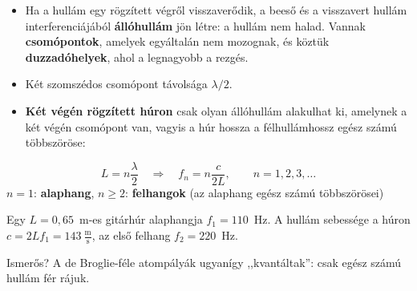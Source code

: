 \documentclass[12pt]{article}
\newcommand{\dia}[1]{\newpage{\Large\bfseries #1}\par\vspace{2pt}{\color{blue!50!black}\hrule height 1pt}\vspace{8pt}}
\begin{document}
\dia{12. Állóhullám}

\begin{minipage}[t]{0.52\linewidth}\vspace{0pt}
\begin{itemize}
  \item Ha a hullám egy rögzített végről visszaverődik, a beeső és a visszavert hullám
    interferenciájából \textbf{állóhullám} jön létre: a hullám nem halad. Vannak
    \textbf{csomópontok}, amelyek egyáltalán nem mozognak, és köztük
    \textbf{duzzadóhelyek}, ahol a legnagyobb a rezgés.
  \item Két szomszédos csomópont távolsága $\lambda/2$.
  \item \textbf{Két végén rögzített húron} csak olyan állóhullám alakulhat ki, amelynek
    a két végén csomópont van, vagyis a húr hossza a félhullámhossz egész számú
    többszöröse:
\end{itemize}
\begin{fontos}
\[ L = n\frac{\lambda}{2} \quad\Longrightarrow\quad f_n = n\frac{c}{2L}, \qquad n = 1, 2, 3, \dots \]
\centering $n = 1$: \textbf{alaphang}, $n \ge 2$: \textbf{felhangok} (az alaphang egész
számú többszörösei)
\end{fontos}
\begin{pelda}
Egy $L = 0{,}65$~m-es gitárhúr alaphangja $f_1 = 110$~Hz. A hullám sebessége a húron
$c = 2Lf_1 = 143~\tfrac{\text{m}}{\text{s}}$, az első felhang $f_2 = 220$~Hz.
\end{pelda}
{\small Ismerős? A de Broglie-féle atompályák ugyanígy ,,kvantáltak'': csak egész számú
hullám fér rájuk.}
\end{minipage}\hfill
\begin{minipage}[t]{0.45\linewidth}\vspace{0pt}\centering
{}
\end{minipage}
\end{document}
